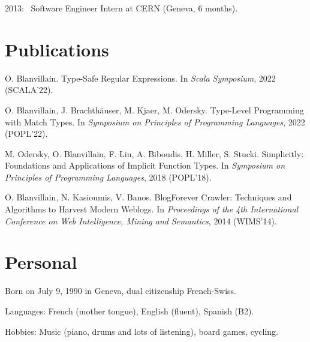 \documentclass[marginmode, 11pt]{res}
\renewcommand{\:}[0]{:~}
\begin{document}
\begin{resume}
2013\: Software Engineer Intern at CERN (Geneva, 6 months).

\section{Publications}

O. Blanvillain. Type-Safe Regular Expressions. In \emph{Scala Symposium}, 2022 (SCALA'22).

O. Blanvillain, J. Brachthäuser, M. Kjaer, M. Odersky. Type-Level Programming with Match Types. In \emph{Symposium on Principles of Programming Languages}, 2022 (POPL'22).

M. Odersky, O. Blanvillain, F. Liu, A. Biboudis, H. Miller, S. Stucki. Simplicitly: Foundations and Applications of Implicit Function Types. In \emph{Symposium on Principles of Programming Languages}, 2018 (POPL'18).

O. Blanvillain, N. Kasioumis, V. Banos. BlogForever Crawler: Techniques and Algorithms to Harvest Modern Weblogs. In \emph{Proceedings of the 4th International Conference on Web Intelligence, Mining and Semantics}, 2014 (WIMS'14).

\section{Personal}

Born on July 9, 1990 in Geneva, dual citizenship French-Swiss.

Languages: French (mother tongue), English (fluent), Spanish (B2).

Hobbies: Music (piano, drums and lots of listening), board
games, cycling.

\end{resume}
\end{document}
